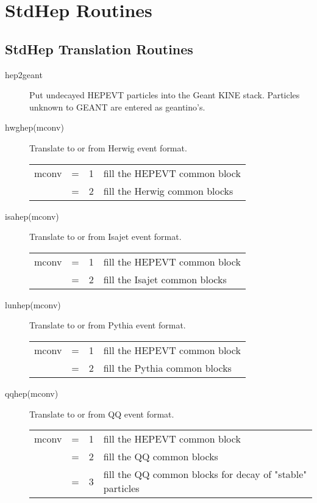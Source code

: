 
\section { StdHep Routines}
\label{routines}

\subsection {StdHep Translation Routines}
\label{conversion routines}

\begin{description}
\item[hep2geant] 
  Put undecayed HEPEVT particles into the Geant KINE stack.
  Particles unknown to GEANT are entered as geantino's.
\item[hwghep(mconv)] Translate to or from Herwig event format.

\begin{tabular}{lcll}
mconv & = & 1 & fill the HEPEVT common block \\
      & = & 2 & fill the Herwig common blocks \\
\end{tabular}

\item[isahep(mconv)] Translate to or from Isajet event format. 

\begin{tabular}{lcll}
mconv & = & 1 & fill the HEPEVT common block \\
      & = & 2 & fill the Isajet common blocks \\
\end{tabular}

\item[lunhep(mconv)] Translate to or from Pythia event format. 

\begin{tabular}{lcll}
mconv & = & 1 & fill the HEPEVT common block \\
      & = & 2 & fill the Pythia common blocks \\
\end{tabular}

\item[qqhep(mconv)] Translate to or from QQ event format.  

\begin{tabular}{lcll}
mconv & = & 1 & fill the HEPEVT common block \\
      & = & 2 & fill the QQ common blocks \\
      & = & 3 & fill the QQ common blocks for decay of "stable" particles \\
\end{tabular}


\end{description}
